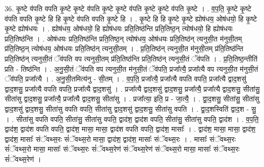 \documentclass[17pt]{extarticle}
\begin{document}
36. कृ॒ष्टे व॑पति वपति कृ॒ष्टे कृ॒ष्टे व॑पति कृ॒ष्टे कृ॒ष्टे व॑पति कृ॒ष्टे कृ॒ष्टे व॑पति कृ॒ष्टे । . व॒प॒ति॒ कृ॒ष्टे कृ॒ष्टे व॑पति वपति कृ॒ष्टे हि हि कृ॒ष्टे व॑पति वपति कृ॒ष्टे हि । . कृ॒ष्टे हि हि कृ॒ष्टे कृ॒ष्टे ह्योष॑धय॒ ओष॑धयो॒ हि कृ॒ष्टे कृ॒ष्टे ह्योष॑धयः । . ह्योष॑धय॒ ओष॑धयो॒ हि ह्योष॑धयः प्रति॒तिष्ठ॑न्ति प्रति॒तिष्ठ॒न् त्योष॑धयो॒ हि ह्योष॑धयः प्रति॒तिष्ठ॑न्ति । . ओष॑धयः प्रति॒तिष्ठ॑न्ति प्रति॒तिष्ठ॒न् त्योष॑धय॒ ओष॑धयः प्रति॒तिष्ठ॑न् त्यनुसी॒त म॑नुसी॒तम् प्र॑ति॒तिष्ठ॒न् त्योष॑धय॒ ओष॑धयः प्रति॒तिष्ठ॑न् त्यनुसी॒तम् । . प्र॒ति॒तिष्ठ॑न् त्यनुसी॒त म॑नुसी॒तम् प्र॑ति॒तिष्ठ॑न्ति प्रति॒तिष्ठ॑न् त्यनुसी॒तं ॅव॑पति वप त्यनुसी॒तम् प्र॑ति॒तिष्ठ॑न्ति प्रति॒तिष्ठ॑न् त्यनुसी॒तं ॅव॑पति । . प्र॒ति॒तिष्ठ॒न्तीति॑ प्रति - तिष्ठ॑न्ति । . अ॒नु॒सी॒तं ॅव॑पति वप त्यनुसी॒त म॑नुसी॒तं ॅव॑पति॒ प्रजा᳚त्यै॒ प्रजा᳚त्यै वप त्यनुसी॒त म॑नुसी॒तं ॅव॑पति॒ प्रजा᳚त्यै । . अ॒नु॒सी॒तमित्य॑नु - सी॒तम् । . व॒प॒ति॒ प्रजा᳚त्यै॒ प्रजा᳚त्यै वपति वपति॒ प्रजा᳚त्यै द्वाद॒शसु॑ द्वाद॒शसु॒ प्रजा᳚त्यै वपति वपति॒ प्रजा᳚त्यै द्वाद॒शसु॑ । . प्रजा᳚त्यै द्वाद॒शसु॑ द्वाद॒शसु॒ प्रजा᳚त्यै॒ प्रजा᳚त्यै द्वाद॒शसु॒ सीता॑सु॒ सीता॑सु द्वाद॒शसु॒ प्रजा᳚त्यै॒ प्रजा᳚त्यै द्वाद॒शसु॒ सीता॑सु । . प्रजा᳚त्या॒ इति॒ प्र - जा॒त्यै॒ । . द्वा॒द॒शसु॒ सीता॑सु॒ सीता॑सु द्वाद॒शसु॑ द्वाद॒शसु॒ सीता॑सु वपति वपति॒ सीता॑सु द्वाद॒शसु॑ द्वाद॒शसु॒ सीता॑सु वपति । . द्वा॒द॒शस्विति॑ द्वाद॒श - सु॒ । . सीता॑सु वपति वपति॒ सीता॑सु॒ सीता॑सु वपति॒ द्वाद॑श॒ द्वाद॑श वपति॒ सीता॑सु॒ सीता॑सु वपति॒ द्वाद॑श । . व॒प॒ति॒ द्वाद॑श॒ द्वाद॑श वपति वपति॒ द्वाद॑श॒ मासा॒ मासा॒ द्वाद॑श वपति वपति॒ द्वाद॑श॒ मासाः᳚ । . द्वाद॑श॒ मासा॒ मासा॒ द्वाद॑श॒ द्वाद॑श॒ मासाः᳚ संॅवथ्स॒रः सं॑ॅवथ्स॒रो मासा॒ द्वाद॑श॒ द्वाद॑श॒ मासाः᳚ संॅवथ्स॒रः । . मासाः᳚ संॅवथ्स॒रः सं॑ॅवथ्स॒रो मासा॒ मासाः᳚ संॅवथ्स॒रः सं॑ॅवथ्स॒रेण॑ संॅवथ्स॒रेण॑ संॅवथ्स॒रो मासा॒ मासाः᳚ संॅवथ्स॒रः सं॑ॅवथ्स॒रेण॑ । \newline
\end{document}
